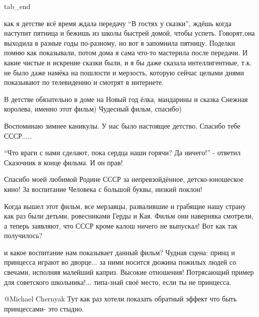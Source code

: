 \begin{itemize}
  tab_end
\fi


\begin{multicols}{2}

как я детстве всё время ждала передачу \enquote{В гостях у сказки}, ждёшь когда
наступит пятница и бежишь из школы быстрей домой, чтобы успеть. Говорят,она
выходила в разные годы по-разному, но вот я запомнила пятницу. Поделки помню
как показывали, потом дома я сама что-то мастерила после передачи. И какие
чистые и искрение сказки были, и я бы даже сказала интеллигентные, т.к. не было
даже намёка на пошлости и мерзость, которую сейчас целыми днями показывают по
телевидению и смотрят в интернете.


В детстве обязательно в доме на Новый год ёлка, мандарины и сказка Снежная
королева, именно этот фильм) Чудесный фильм, спасибо)


Воспоминаю зимнее каникулы. У нас было настоящее детство. Спасибо тебе СССР.....


\enquote{Что враги с нами сделают, пока сердца наши горячи? Да ничего!} - ответил
Сказочник в конце фильма. И он прав!


Спасибо  моей любимой Родине СССР за непревзойдённое, детско-юношеское кино! За
воспитание  Человека с большой буквы, низкий поклон!

\begin{itemize} %


Когда вышел этот фильм, все мерзавцы, развалившие и грабящие нашу страну как
раз были детьми, ровесниками Герды и Кая. Фильм они наверняка смотрели, а
теперь заявляют, что СССР кроме калош ничего не выпускал! Вот как так
получилось?


и какое воспитание нам показывает данный фильм? Чудная сцена: принц и принцесса
играют во дворце... за ними носится дюжина пожилых людей со свечами, исполняя
малейший каприз. Высокие отношения! Потрясающий пример для советского
школьника!... типа-знай своё место, если ты не принцесса.


 @Michael Chernyak  Тут как раз хотели показать обратный эффект что быть
 принцессами- это стыдно.


\end{itemize}
\end{multicols}
\end{itemize}

